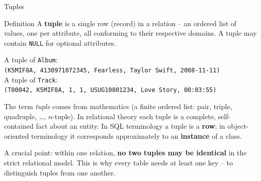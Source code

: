 \begin{frame}{Tuples}
  \begin{block}{Definition}
    A \textbf{tuple} is a single row (record) in a relation -- an ordered
    list of values, one per attribute, all conforming to their respective
    domains.  A tuple may contain \texttt{NULL} for optional attributes.
  \end{block}

  \begin{examples}{}
    A tuple of \texttt{Album}:\\[4pt]
    \texttt{(K5MIF8A,\ 4130971072345,\ Fearless,\ Taylor Swift,\ 2008-11-11)}\\[6pt]
    A tuple of \texttt{Track}:\\[4pt]
    \texttt{(T00042,\ K5MIF8A,\ 1,\ 1,\ USUG10801234,\ Love Story,\ 00:03:55)}
  \end{examples}

  The term \emph{tuple} comes from mathematics (a finite ordered list:
  pair, triple, quadruple, \ldots, $n$-tuple).  In relational theory each
  tuple is a complete, self-contained fact about an entity.
  In SQL terminology a tuple is a \textbf{row}; in object-oriented
  terminology it corresponds approximately to an \textbf{instance} of a class.

  \medskip
  A crucial point: within one relation, \textbf{no two tuples may be
  identical} in the strict relational model.  This is why every table
  needs at least one key -- to distinguish tuples from one another.
\end{frame}

